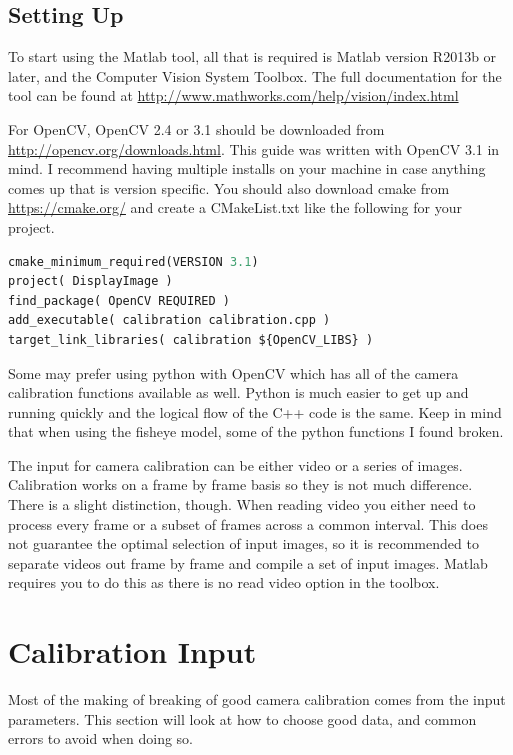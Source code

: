 \documentclass{article}
\begin{document}
\subsection{Setting Up}

To start using the Matlab tool, all that is required is Matlab version R2013b or later, and the Computer Vision System Toolbox. The full documentation for the tool can be found at \url{http://www.mathworks.com/help/vision/index.html}

For OpenCV, OpenCV 2.4 or 3.1 should be downloaded from \url{http://opencv.org/downloads.html}. This guide was written with OpenCV 3.1 in mind. I recommend having multiple installs on your machine in case anything comes up that is version specific. You should also download cmake from \url{https://cmake.org/} and create a CMakeList.txt like the following for your project.


\begin{lstlisting}[language=python, frame=single]
cmake_minimum_required(VERSION 3.1)
project( DisplayImage )
find_package( OpenCV REQUIRED )
add_executable( calibration calibration.cpp )
target_link_libraries( calibration ${OpenCV_LIBS} )
\end{lstlisting}

Some may prefer using python with OpenCV which has all of the camera calibration functions available as well. Python is much easier to get up and running quickly and the logical flow of the C++ code is the same. Keep in mind that when using the fisheye model, some of the python functions I found broken. 

The input for camera calibration can be either video or a series of images. Calibration works on a frame by frame basis so they is not much difference. There is a slight distinction, though. When reading video you either need to process every frame or a subset of frames across a common interval. This does not guarantee the optimal selection of input images, so it is recommended to separate videos out frame by frame and compile a set of input images. Matlab requires you to do this as there is no read video option in the toolbox. 

\section{Calibration Input}

Most of the making of breaking of good camera calibration comes from the input parameters. This section will look at how to choose good data, and common errors to avoid when doing so. 
\end{document}
